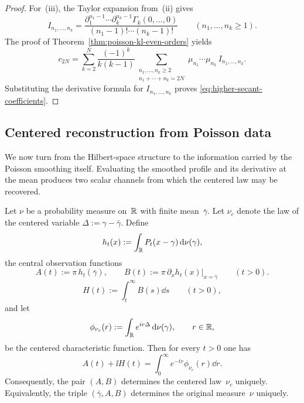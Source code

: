 \begin{proof}
For~(iii), the Taylor expansion from~(ii) gives
\[
I_{n_1,\dots,n_k}
=
\frac{
\partial_1^{n_1-1}\cdots\partial_k^{n_k-1}\Gamma_k(0,\dots,0)}
{(n_1-1)!\cdots(n_k-1)!}
\qquad(n_1,\dots,n_k\ge 1).
\]
The proof of Theorem~\ref{thm:poisson-kl-even-orders} yields
\[
c_{2N}
=
\sum_{k=2}^{N}\frac{(-1)^k}{k(k-1)}
\sum_{\substack{n_1,\dots,n_k\ge 2\\n_1+\cdots+n_k=2N}}
\mu_{n_1}\cdots\mu_{n_k}\,I_{n_1,\dots,n_k}.
\]
Substituting the derivative formula for $I_{n_1,\dots,n_k}$ proves
\eqref{eq:higher-secant-coefficients}.
\end{proof}

\subsection{Centered reconstruction from Poisson data}

We now turn from the Hilbert-space structure to the information carried
by the Poisson smoothing itself.  Evaluating the smoothed profile and
its derivative at the mean produces two scalar channels from which the
centered law may be recovered.

\begin{theorem}%
\label{thm:poisson-central-two-channel}
Let $\nu$ be a probability measure on~$\mathbb{R}$ with finite mean~$\bar\gamma$.
Let $\nu_c$ denote the law of the centered variable
$\Delta:=\gamma-\bar\gamma$.  Define
\[
h_t(x):=\int_{\mathbb{R}}P_t(x-\gamma)\,\mathrm{d}\nu(\gamma),
\]
the central observation functions
\[
A(t):=\pi\,h_t(\bar\gamma),
\qquad
B(t):=\pi\,\partial_x h_t(x)\big|_{x=\bar\gamma}
\qquad(t>0).
\]
\[
H(t):=\int_t^\infty B(s)\dd s
\qquad(t>0),
\]
and let
\[
\phi_{\nu_c}(r):=\int_{\mathbb{R}}e^{ir\Delta}\,\mathrm{d}\nu(\gamma),
\qquad r\in\mathbb{R},
\]
be the centered characteristic function.  Then for every $t>0$ one has
\begin{equation}\label{eq:poisson-laplace-reconstruction}
A(t)+\ii H(t)
=\int_0^\infty e^{-tr}\phi_{\nu_c}(r)\dd r.
\end{equation}
Consequently, the pair $(A,B)$ determines the centered law~$\nu_c$
uniquely.  Equivalently, the triple $(\bar\gamma,A,B)$ determines the
original measure~$\nu$ uniquely.
\end{theorem}

